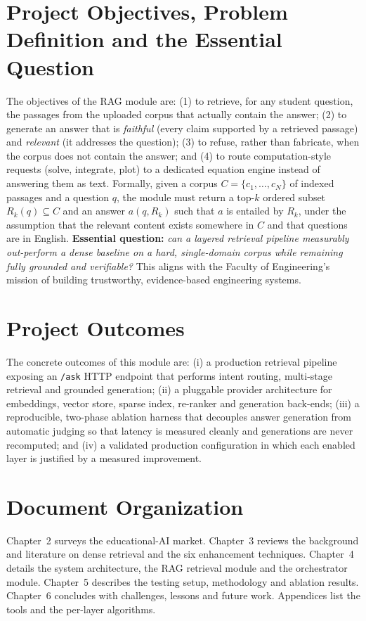 \documentclass[12pt,a4paper]{report}
\begin{document}
\section{Project Objectives, Problem Definition and the Essential Question}
The objectives of the RAG module are: (1) to retrieve, for any student question,
the passages from the uploaded corpus that actually contain the answer; (2) to
generate an answer that is \emph{faithful} (every claim supported by a retrieved
passage) and \emph{relevant} (it addresses the question); (3) to refuse, rather
than fabricate, when the corpus does not contain the answer; and (4) to route
computation-style requests (solve, integrate, plot) to a dedicated equation
engine instead of answering them as text. Formally, given a corpus
$C=\{c_1,\dots,c_N\}$ of indexed passages and a question $q$, the module must
return a top-$k$ ordered subset $R_k(q)\subseteq C$ and an answer $a(q,R_k)$ such
that $a$ is entailed by $R_k$, under the assumption that the relevant content
exists somewhere in $C$ and that questions are in English. \textbf{Essential
question:} \emph{can a layered retrieval pipeline measurably out-perform a dense
baseline on a hard, single-domain corpus while remaining fully grounded and
verifiable?} This aligns with the Faculty of Engineering's mission of building
trustworthy, evidence-based engineering systems.

\section{Project Outcomes}
The concrete outcomes of this module are: (i) a production retrieval pipeline
exposing an \texttt{/ask} HTTP endpoint that performs intent routing, multi-stage
retrieval and grounded generation; (ii) a pluggable provider architecture for
embeddings, vector store, sparse index, re-ranker and generation back-ends;
(iii) a reproducible, two-phase ablation harness that decouples answer generation
from automatic judging so that latency is measured cleanly and generations are
never recomputed; and (iv) a validated production configuration in which each
enabled layer is justified by a measured improvement.

\section{Document Organization}
Chapter~2 surveys the educational-AI market. Chapter~3 reviews the background and
literature on dense retrieval and the six enhancement techniques. Chapter~4
details the system architecture, the RAG retrieval module and the orchestrator
module. Chapter~5 describes the testing setup, methodology and ablation results.
Chapter~6 concludes with challenges, lessons and future work. Appendices list the
tools and the per-layer algorithms.
\end{document}
